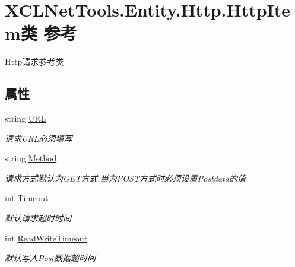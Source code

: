 \hypertarget{class_x_c_l_net_tools_1_1_entity_1_1_http_1_1_http_item}{\section{X\-C\-L\-Net\-Tools.\-Entity.\-Http.\-Http\-Item类 参考}
\label{class_x_c_l_net_tools_1_1_entity_1_1_http_1_1_http_item}
}


Http请求参考类  


\subsection*{属性}
\begin{DoxyCompactItemize}
\item 
string \hyperlink{class_x_c_l_net_tools_1_1_entity_1_1_http_1_1_http_item_aaaa3a229c51a9c1dab14f61c0104b380}{U\-R\-L}
\begin{DoxyCompactList}\small\item\em 请求\-U\-R\-L必须填写 \end{DoxyCompactList}\item 
string \hyperlink{class_x_c_l_net_tools_1_1_entity_1_1_http_1_1_http_item_a4c675d85e9d3864e5c5ad04c4a4ae3cd}{Method}
\begin{DoxyCompactList}\small\item\em 请求方式默认为\-G\-E\-T方式,当为\-P\-O\-S\-T方式时必须设置\-Postdata的值 \end{DoxyCompactList}\item 
int \hyperlink{class_x_c_l_net_tools_1_1_entity_1_1_http_1_1_http_item_a186cca2bc3a89d6385862bdf9cdcc70d}{Timeout}
\begin{DoxyCompactList}\small\item\em 默认请求超时时间 \end{DoxyCompactList}\item 
int \hyperlink{class_x_c_l_net_tools_1_1_entity_1_1_http_1_1_http_item_adfed36da49bce477ba004f8cf224633c}{Read\-Write\-Timeout}
\begin{DoxyCompactList}\small\item\em 默认写入\-Post数据超时间 \end{DoxyCompactList}\item 

\end{DoxyCompactItemize}
